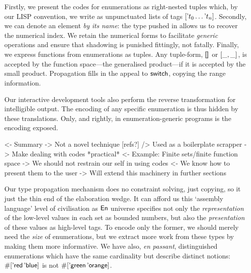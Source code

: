 Firstly, we present the codes for enumerations as right-nested tuples
which, by our LISP convention, we write as unpunctuated lists of tags
\(\sqr{\etag{t_0}\ldots\etag{t_n}}\).
Secondly, we can denote an element \emph{by its
name}: the type pushed in allows us to recover the numerical
index. We retain the numerical forms to facilitate
\emph{generic} operations and ensure that shadowing is punished
fittingly, not fatally.
Finally, we express functions from enumerations as tuples.
Any tuple-form, \(\void\) or \(\pair{\_}{\_}{}\), is accepted by the
function space---the generalised product---if it is accepted by the
small product. Propagation fills in the appeal to $\F{switch}$,
copying the range information.

Our interactive development tools also perform the
reverse transformation for intelligible output.
The encoding of any specific enumeration is thus hidden by these
translations. Only, and rightly, in enumeration-generic programs is the
encoding exposed.

\begin{wstructure}
<- Summary
    -> Not a novel technique [refs?]
        /> Used as a boilerplate scrapper
    -> Make dealing with codes *practical*
        <- Example: Finite sets/finite function space
        -> We should not restrain our self in using codes
            <- We know how to present them to the user
-> Will extend this machinery in further sections
\end{wstructure}



Our type propagation mechanism does no constraint
solving, just copying, so it just the thin end of the elaboration wedge.
It can afford us this `assembly
language' level of civilisation as \(\EnumU\) universe
specifies not only the \emph{representation} of the
low-level values in each set as bounded numbers, but also the
\emph{presentation} of these values as high-level tags. To encode only
the former, we should merely need the \emph{size} of enumerations, but
we extract more work from these types by making them more informative.
We have also, \emph{en passant}, distinguished enumerations which have
the same cardinality but describe distinct notions:
\(\EnumT{\sqr{\etag{\CN{red}}\,\etag{\CN{blue}}}}\) is not
\(\EnumT{\sqr{\etag{\CN{green}}\,\etag{\CN{orange}}}}\).
